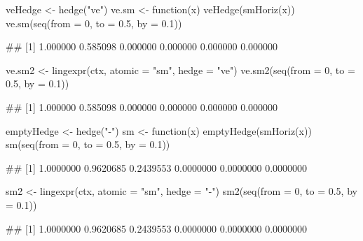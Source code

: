 \documentclass{article}\usepackage[]{graphicx}\usepackage[]{color}
\begin{document}
\begin{Schunk}
% --begin: "hedge"
\begin{Sinput}
veHedge <- hedge("ve")
ve.sm <- function(x) veHedge(smHoriz(x))
ve.sm(seq(from = 0, to = 0.5, by = 0.1))
\end{Sinput}
\begin{Soutput}
## [1] 1.000000 0.585098 0.000000 0.000000 0.000000 0.000000
\end{Soutput}
%
% --end: "hedge"
\end{Schunk}


\begin{Schunk}
% --begin: "lingexpr"
\begin{Sinput}
ve.sm2 <- lingexpr(ctx, atomic = "sm", hedge = "ve")
ve.sm2(seq(from = 0, to = 0.5, by = 0.1))
\end{Sinput}
\begin{Soutput}
## [1] 1.000000 0.585098 0.000000 0.000000 0.000000 0.000000
\end{Soutput}
%
% --end: "lingexpr"
\end{Schunk}

\begin{Schunk}
% --begin: "emptyhedge1"
\begin{Sinput}
emptyHedge <- hedge("-")
sm <- function(x) emptyHedge(smHoriz(x))
sm(seq(from = 0, to = 0.5, by = 0.1))
\end{Sinput}
\begin{Soutput}
## [1] 1.0000000 0.9620685 0.2439553 0.0000000 0.0000000 0.0000000
\end{Soutput}
%
% --end: "emptyhedge1"
\end{Schunk}

\begin{Schunk}
% --begin: "emptyhedge2"
\begin{Sinput}
sm2 <- lingexpr(ctx, atomic = "sm", hedge = "-")
sm2(seq(from = 0, to = 0.5, by = 0.1))
\end{Sinput}
\begin{Soutput}
## [1] 1.0000000 0.9620685 0.2439553 0.0000000 0.0000000 0.0000000
\end{Soutput}
%
% --end: "emptyhedge2"
\end{Schunk}
\end{document}
